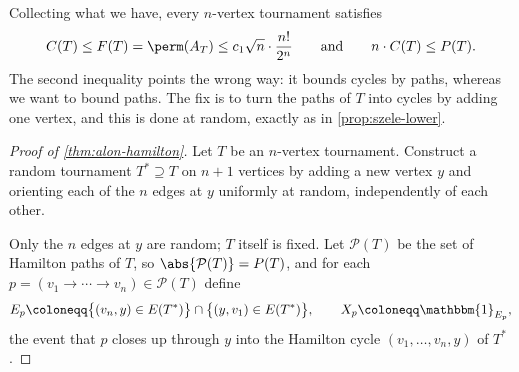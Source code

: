 Collecting what we have, every \(n\)-vertex tournament satisfies
\[
    C(T) \le F(T) = \perm(A_T) \le c_1 \sqrt{n} \cdot \frac{n!}{2^n}
    \qquad \text{and} \qquad
    n \cdot C(T) \le P(T).
\]
The second inequality points the wrong way: it bounds cycles by paths, whereas we want to bound paths. The fix is to turn the paths of \(T\) into cycles by adding one vertex, and this is done at random, exactly as in \autoref{prop:szele-lower}.

\begin{proof}[Proof of \autoref{thm:alon-hamilton}]
    Let \(T\) be an \(n\)-vertex tournament. Construct a random tournament \(T^* \supseteq T\) on \(n+1\) vertices by adding a new vertex \(y\) and orienting each of the \(n\) edges at \(y\) uniformly at random, independently of each other.
    \begin{center}
    \end{center}

    Only the \(n\) edges at \(y\) are random; \(T\) itself is fixed. Let \(\mathcal{P}(T)\) be the set of Hamilton paths of \(T\), so \(\abs{\mathcal{P}(T)} = P(T)\), and for each \(p = (v_1 \to \cdots \to v_n) \in \mathcal{P}(T)\) define
    \[
        E_p \coloneqq \bigl\{ (v_n, y) \in E(T^*) \bigr\} \cap \bigl\{ (y, v_1) \in E(T^*) \bigr\},
        \qquad X_p \coloneqq \mathbbm{1}_{E_p},
    \]
    the event that \(p\) closes up through \(y\) into the Hamilton cycle \((v_1, \ldots, v_n, y)\) of \(T^*\).


\end{proof}
